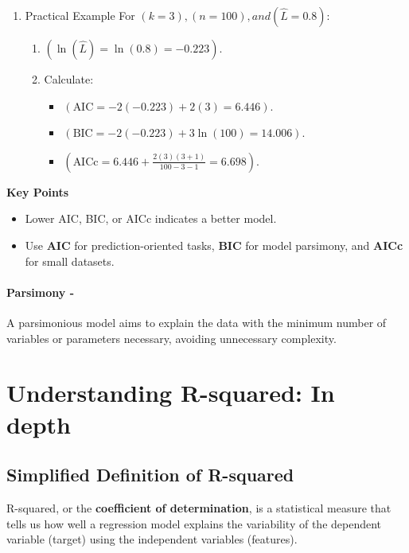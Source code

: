 \documentclass[12pt]{book}
\begin{document}
\begin{enumerate}
    \item Practical Example
    For \(( k = 3 ), ( n = 100 ), and ( \hat{L} = 0.8 )\):
    \begin{enumerate}
        \item \(( \ln(\hat{L}) = \ln(0.8) = -0.223 )\).
        \item Calculate:
        \begin{itemize}
            \item  [-] \(( \text{AIC} = -2(-0.223) + 2(3) = 6.446 )\).
            \item [-] \(( \text{BIC} = -2(-0.223) + 3\ln(100) = 14.006 )\).
            \item [-] \(( \text{AICc} = 6.446 + \frac{2(3)(3+1)}{100 - 3 - 1} = 6.698 )\).
        \end{itemize}
    \end{enumerate}
\end{enumerate}

\textbf{Key Points}
\begin{itemize}
    \item [-] Lower AIC, BIC, or AICc indicates a better model.
    \item [-] Use \textbf{AIC} for prediction-oriented tasks, \textbf{BIC} for model parsimony, and \textbf{AICc} for small datasets.
\end{itemize}

\paragraph*{Parsimony - } A parsimonious model aims to explain the data with the minimum number of variables or parameters necessary, avoiding unnecessary complexity.

\section{Understanding R-squared: In depth}

\subsection*{ \textbf{Simplified Definition of R-squared}}

R-squared, or the \textbf{coefficient of determination}, is a statistical measure that tells us how well a regression model explains the variability of the dependent variable (target) using the independent variables (features). 
\end{document}
